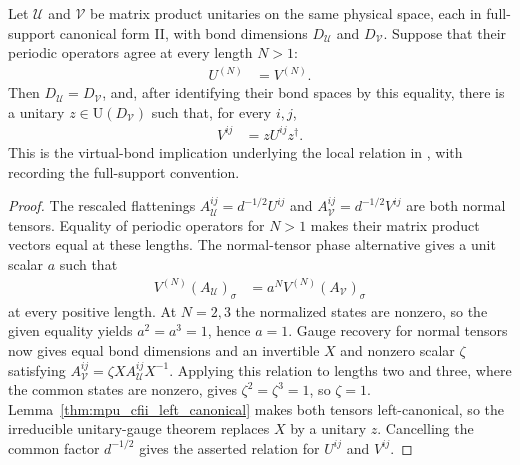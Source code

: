 \begin{lemma}
    \label{thm:mpu_cfii_equal_periodic_virtual_unitary}
    \leanok
    Let $\mathcal U$ and $\mathcal V$ be matrix product unitaries on the same
    physical space, each in full-support canonical form II, with bond
    dimensions $D_{\mathcal U}$ and $D_{\mathcal V}$. Suppose that their
    periodic operators agree at every length $N>1$:
    \begin{align}
        U^{(N)} & =V^{(N)}.
    \end{align}
    Then $D_{\mathcal U}=D_{\mathcal V}$, and, after identifying their bond
    spaces by this equality, there is a unitary
    $z\in\mathrm U(D_{\mathcal V})$ such that, for every $i,j$,
    \begin{align}
        V^{ij} & =zU^{ij}z^\dagger.
    \end{align}
    This is the virtual-bond implication underlying the local relation in
    \cite[Equations (SFuu) and (SFvv), lines 624--652]{Cirac2017MPU}, with \cite{gap:mpu_canonical_form_full_support} recording the
    full-support
    convention.
\end{lemma}

\begin{proof}\leanok
    The rescaled flattenings $A_{\mathcal U}^{ij}=d^{-1/2}U^{ij}$ and
    $A_{\mathcal V}^{ij}=d^{-1/2}V^{ij}$ are both normal tensors. Equality
    of periodic operators for $N>1$ makes their matrix product vectors
    equal at these lengths. The normal-tensor phase alternative gives a unit
    scalar $a$ such that
    \begin{align}
        V^{(N)}(A_{\mathcal U})_\sigma
         & =a^N V^{(N)}(A_{\mathcal V})_\sigma
    \end{align}
    at every positive length. At $N=2,3$ the normalized states are nonzero,
    so the given equality yields $a^2=a^3=1$, hence $a=1$. Gauge recovery for
    normal tensors now gives equal bond dimensions and an invertible $X$ and
    nonzero scalar $\zeta$ satisfying
    $A_{\mathcal V}^{ij}=\zeta XA_{\mathcal U}^{ij}X^{-1}$. Applying this
    relation to lengths two and three, where the common states are nonzero,
    gives $\zeta^2=\zeta^3=1$, so $\zeta=1$.
    Lemma~\ref{thm:mpu_cfii_left_canonical} makes both tensors
    left-canonical, so the irreducible unitary-gauge theorem replaces $X$
    by a unitary $z$. Cancelling the common factor $d^{-1/2}$ gives the
    asserted relation for $U^{ij}$ and $V^{ij}$.
\end{proof}

